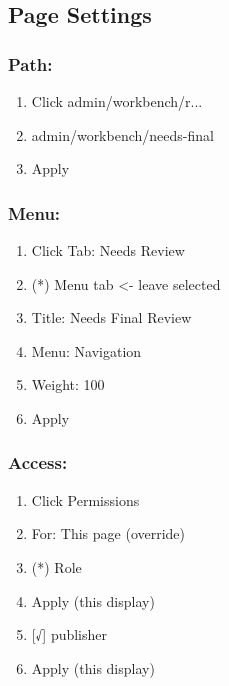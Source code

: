 \documentclass[letterpaper,10pt,english]{sphinxmanual}
\begin{document}
\subsection{Page Settings}
\label{moderation:page-settings}

\subsubsection{Path:}
\label{moderation:path}\begin{enumerate}
\item {} 
Click admin/workbench/r...

\item {} 
admin/workbench/needs-final

\item {} 
Apply

\end{enumerate}


\subsubsection{Menu:}
\label{moderation:menu}\begin{enumerate}
\item {} 
Click Tab: Needs Review

\item {} 
(*) Menu tab \textless{}- leave selected

\item {} 
Title: Needs Final Review

\item {} 
Menu: Navigation

\item {} 
Weight: 100

\item {} 
Apply

\end{enumerate}


\subsubsection{Access:}
\label{moderation:access}\begin{enumerate}
\item {} 
Click Permissions

\item {} 
For: This page (override)

\item {} 
(*) Role

\item {} 
Apply (this display)

\item {} 
{[}√{]} publisher

\item {} 
Apply (this display)

\end{enumerate}
\end{document}
